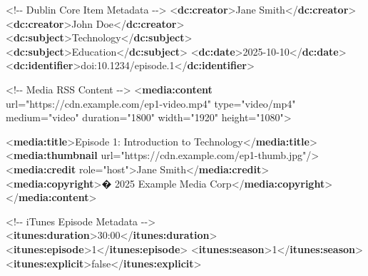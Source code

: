 \documentclass[
  letterpaper,
  DIV=11,
  numbers=noendperiod]{scrartcl}
\newenvironment{Shaded}{\begin{snugshade}}{\end{snugshade}}
\newcommand{\CommentTok}[1]{\textcolor[rgb]{0.37,0.37,0.37}{#1}}
\newcommand{\KeywordTok}[1]{\textcolor[rgb]{0.00,0.23,0.31}{\textbf{#1}}}
\newcommand{\NormalTok}[1]{\textcolor[rgb]{0.00,0.23,0.31}{#1}}
\newcommand{\OtherTok}[1]{\textcolor[rgb]{0.00,0.23,0.31}{#1}}
\newcommand{\StringTok}[1]{\textcolor[rgb]{0.13,0.47,0.30}{#1}}
\begin{document}
\begin{Shaded}
\begin{Highlighting}[]
      \CommentTok{\textless{}!{-}{-} Dublin Core Item Metadata {-}{-}\textgreater{}}
\NormalTok{      \textless{}}\KeywordTok{dc:creator}\NormalTok{\textgreater{}Jane Smith\textless{}/}\KeywordTok{dc:creator}\NormalTok{\textgreater{}}
\NormalTok{    \textless{}}\KeywordTok{dc:creator}\NormalTok{\textgreater{}John Doe\textless{}/}\KeywordTok{dc:creator}\NormalTok{\textgreater{}}
\NormalTok{      \textless{}}\KeywordTok{dc:subject}\NormalTok{\textgreater{}Technology\textless{}/}\KeywordTok{dc:subject}\NormalTok{\textgreater{}}
\NormalTok{      \textless{}}\KeywordTok{dc:subject}\NormalTok{\textgreater{}Education\textless{}/}\KeywordTok{dc:subject}\NormalTok{\textgreater{}}
\NormalTok{      \textless{}}\KeywordTok{dc:date}\NormalTok{\textgreater{}2025{-}10{-}10\textless{}/}\KeywordTok{dc:date}\NormalTok{\textgreater{}}
\NormalTok{      \textless{}}\KeywordTok{dc:identifier}\NormalTok{\textgreater{}doi:10.1234/episode.1\textless{}/}\KeywordTok{dc:identifier}\NormalTok{\textgreater{}}
 
      \CommentTok{\textless{}!{-}{-} Media RSS Content {-}{-}\textgreater{}}
\NormalTok{      \textless{}}\KeywordTok{media:content} 
\OtherTok{  url=}\StringTok{"https://cdn.example.com/ep1{-}video.mp4"}
\OtherTok{          type=}\StringTok{"video/mp4"}
\OtherTok{        medium=}\StringTok{"video"}
\OtherTok{          duration=}\StringTok{"1800"}
\OtherTok{          width=}\StringTok{"1920"}
\OtherTok{          height=}\StringTok{"1080"}\NormalTok{\textgreater{}}
     
\NormalTok{      \textless{}}\KeywordTok{media:title}\NormalTok{\textgreater{}Episode 1: Introduction to Technology\textless{}/}\KeywordTok{media:title}\NormalTok{\textgreater{}}
\NormalTok{    \textless{}}\KeywordTok{media:thumbnail}\OtherTok{ url=}\StringTok{"https://cdn.example.com/ep1{-}thumb.jpg"}\NormalTok{/\textgreater{}}
\NormalTok{      \textless{}}\KeywordTok{media:credit}\OtherTok{ role=}\StringTok{"host"}\NormalTok{\textgreater{}Jane Smith\textless{}/}\KeywordTok{media:credit}\NormalTok{\textgreater{}}
\NormalTok{        \textless{}}\KeywordTok{media:copyright}\NormalTok{\textgreater{}� 2025 Example Media Corp\textless{}/}\KeywordTok{media:copyright}\NormalTok{\textgreater{}}
\NormalTok{      \textless{}/}\KeywordTok{media:content}\NormalTok{\textgreater{}}
      
      \CommentTok{\textless{}!{-}{-} iTunes Episode Metadata {-}{-}\textgreater{}}
\NormalTok{      \textless{}}\KeywordTok{itunes:duration}\NormalTok{\textgreater{}30:00\textless{}/}\KeywordTok{itunes:duration}\NormalTok{\textgreater{}}
\NormalTok{      \textless{}}\KeywordTok{itunes:episode}\NormalTok{\textgreater{}1\textless{}/}\KeywordTok{itunes:episode}\NormalTok{\textgreater{}}
\NormalTok{      \textless{}}\KeywordTok{itunes:season}\NormalTok{\textgreater{}1\textless{}/}\KeywordTok{itunes:season}\NormalTok{\textgreater{}}
\NormalTok{      \textless{}}\KeywordTok{itunes:explicit}\NormalTok{\textgreater{}false\textless{}/}\KeywordTok{itunes:explicit}\NormalTok{\textgreater{}}
      

\end{Highlighting}
\end{Shaded}
\end{document}
